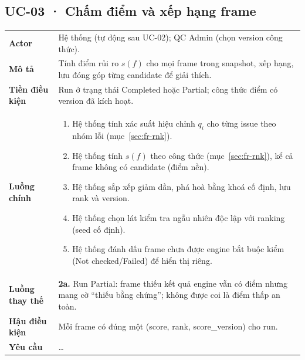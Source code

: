 \subsection*{UC-03 · Chấm điểm và xếp hạng frame}
\begin{xltabular}{\linewidth}{@{}>{\bfseries}L{3.2cm}Y@{}}
\toprule
Actor & Hệ thống (tự động sau UC-02); QC Admin (chọn version công thức).\\
Mô tả & Tính điểm rủi ro \(s(f)\) cho mọi frame trong snapshot, xếp hạng, lưu đóng góp từng candidate để giải thích.\\
Tiền điều kiện & Run ở trạng thái Completed hoặc Partial; công thức điểm có version đã kích hoạt.\\
Luồng chính &
\begin{enumerate}[nosep]
  \item Hệ thống tính xác suất hiệu chỉnh \(q_i\) cho từng issue theo nhóm lỗi (mục~\ref{sec:fr-rnk}).
  \item Hệ thống tính \(s(f)\) theo công thức (mục~\ref{sec:fr-rnk}), kể cả frame không có candidate (điểm nền).
  \item Hệ thống sắp xếp giảm dần, phá hoà bằng khoá cố định, lưu rank và version.
  \item Hệ thống chọn lát kiểm tra ngẫu nhiên độc lập với ranking (seed cố định).
  \item Hệ thống đánh dấu frame chưa được engine bắt buộc kiểm (Not checked/Failed) để hiển thị riêng.
\end{enumerate}\\
Luồng thay thế & \textbf{2a.} Run Partial: frame thiếu kết quả engine vẫn có điểm nhưng mang cờ ``thiếu bằng chứng''; không được coi là điểm thấp an toàn.\\
Hậu điều kiện & Mỗi frame có đúng một (score, rank, score\_version) cho run.\\
Yêu cầu & …\\
\bottomrule
\end{xltabular}


